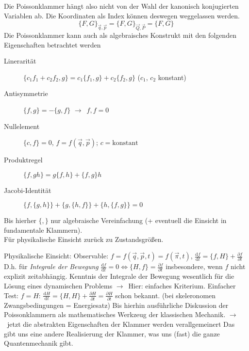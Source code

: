 \documentclass[oneside]{book}
\theoremstyle{definition}
\newcommand{\conseq}{$\rightarrow$~}
\renewcommand{\d}{\mathrm d}
\newcommand{\ddd}[2]{\frac{\d #1}{\d #2}}
\newcommand{\ffpartial}[2]{\frac{\partial #1}{\partial #2}}
\newcommand{\const}{\text{konstant}}
\begin{document}
Die Poissonklammer hängt also nicht von der Wahl der kanonisch konjugierten Variablen ab. Die Koordinaten als Index können deswegen weggelassen werden.
$$\{F, G\}_{\vec{q}, \vec{p}} = \{F, G\}_{\vec{Q}, \vec{P}} = \{F, G\}$$
Die Poissonklammer kann auch als algebraisches Konstrukt mit den folgenden Eigenschaften betrachtet werden 
\begin{description}
	\item[Linerarität] $\{c_1 f_1 + c_2 f_2, g\} = c_1 \{f_1, g\} + c_2 \{f_2, g\}$ ($c_1$, $c_2$ konstant)
	\item[Antisymmetrie] $\{f, g\} = - \{g, f\}$ \conseq ${f, f} = 0$
	\item[Nullelement] $\{c, f\} = 0$, $f=f(\vec{q}, \vec{p})$; $c = \const$
	\item[Produktregel] $\{f, g h\} = g \{f, h\} + \{f, g\} h$
	\item[Jacobi-Identität] $\{f, \{g, h\}\} + \{g, \{h, f\}\} + \{h, \{f, g\}\} = 0$
\end{description}

Bis hierher $\{,\}$ nur algebraische Vereinfachung (+ eventuell die Einsicht in fundamentale Klammern).\\
Für physikalische Einsicht zurück zu Zustandsgrößen.

Physikalische Einsicht:
Observable: $f = f(\vec{q}, \vec{p}, t) = f(\vec{\pi}, t)$, $\ddd{f}{t} = \{f, H\} + \ffpartial{f}{t}$
D.h. für \textit{Integrale der Bewegung}
$\ddd{f}{t} = 0 \Leftrightarrow \{H, f\} = \ffpartial{f}{t}$
insbesondere, wenn $f$ nicht explizit zeitabhängig. Kenntnis der Integrale der Bewegung wesentlich für die Lösung eines dynamischen Problems \conseq Hier: einfaches Kriterium.
Einfacher Test: $f = H$: $\ddd{H}{t} = \{H, H\} + \ffpartial{H}{t} = \ffpartial{H}{t}$ schon bekannt. (bei skeleronomen Zwangsbedingungen = Energiesatz) 
Bis hierhin ausführliche Diskussion der Poissonklammern als mathematisches Werkzeug der klassischen Mechanik.
\conseq jetzt die abstrakten Eigenschaften der Klammer werden verallgemeinert
Das gibt uns eine andere Realisierung der Klammer, was uns (fast) die ganze Quantenmechanik gibt.

\newcommand{\fihbar}{\frac{1}{i \hbar}}
\end{document}
